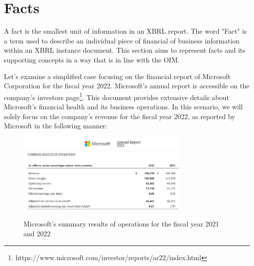 \section{Facts}
\label{sec:facts}

A fact is the smallest unit of information in an XBRL report. 
The word "Fact" is a term used to describe an individual piece of financial of business information within an XBRL instance document. 
This section aims to represent facts and its supporting concepts in a way that is in line with the OIM.

Let's examine a simplified case focusing on the financial report of Microsoft Corporation for the fiscal year 2022.
Microsoft's annual report is accessible on the company's investors page\footnote{https://www.microsoft.com/investor/reports/ar22/index.html}.
This document provides extensive details about Microsoft's financial health and its business operations.
In this scenario, we will solely focus on the company's revenue for the fiscal year 2022,
as reported by Microsoft in the following manner:

\begin{figure}[H]
    \centering
    \includegraphics[width=0.75\textwidth]{images/microsoft_annual_report_2022.png}
    \caption{Microsoft's summary results of operations for the fiscal year 2021 and 2022}
    \label{fig:microsoft_annual_report_2022}
    \cite{microsoft2022ar}
\end{figure}


